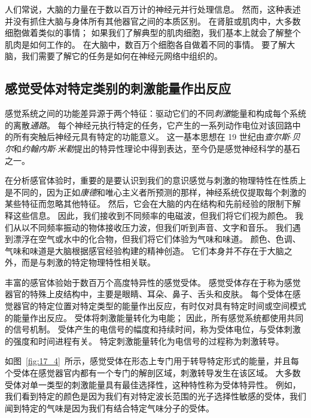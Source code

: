 人们常说，大脑的力量在于数以百万计的神经元并行处理信息。 
然而，这种表述并没有抓住大脑与身体所有其他器官之间的本质区别。 
在肾脏或肌肉中，大多数细胞做着类似的事情； 
如果我们了解典型的肌肉细胞，我们基本上就会了解整个肌肉是如何工作的。 
在大脑中，数百万个细胞各自做着不同的事情。 
要了解大脑，我们需要了解它的任务是如何在神经元网络中组织的。



\subsection{感觉受体对特定类别的刺激能量作出反应}

感觉系统之间的功能差异源于两个特征：驱动它们的不同\textit{刺激}能量和构成每个系统的离散\textit{通路}。 
每个神经元执行特定的任务，它产生的一系列动作电位对该回路中的所有突触后神经元具有特定的功能意义。 
这一基本思想在 19 世纪由\textit{查尔斯$\cdot$贝尔}和\textit{约翰内斯$\cdot$米勒}提出的特异性理论中得到表达，至今仍是感觉神经科学的基石之一。


在分析感官体验时，重要的是要认识到我们的意识感觉与刺激的物理特性在性质上是不同的，因为正如\textit{康德}和唯心主义者所预测的那样，神经系统仅提取每个刺激的某些特征而忽略其他特征。 
然后，它会在大脑的内在结构和先前经验的限制下解释这些信息。 
因此，我们接收到不同频率的电磁波，但我们将它们视为颜色。 
我们从以不同频率振动的物体接收压力波，但我们听到声音、文字和音乐。 
我们遇到漂浮在空气或水中的化合物，但我们将它们体验为气味和味道。 
颜色、色调、气味和味道是大脑根据感官经验构建的精神创造。 
它们本身并不存在于大脑之外，而是与刺激的特定物理特性相关联。


丰富的感官体验始于数百万个高度特异性的感觉受体。 
感觉受体存在于称为感觉器官的特殊上皮结构中，主要是眼睛、耳朵、鼻子、舌头和皮肤。 
每个受体在感觉器官的特定位置对特定类型的能量作出反应，有时仅对具有特定时间或空间模式的能量作出反应。 
受体将刺激能量转化为电能； 
因此，所有感觉系统都使用共同的信号机制。 
受体产生的电信号的幅度和持续时间，称为受体电位，与受体刺激的强度和时间进程有关。
特定刺激能量转化为电信号的过程称为刺激转导。


如图~\ref{fig:17_4}~所示，感觉受体在形态上专门用于转导特定形式的能量，并且每个受体在感觉器官内都有一个专门的解剖区域，刺激转导发生在该区域。 
大多数受体对单一类型的刺激能量具有最佳选择性，这种特性称为受体特异性。
例如，我们看到特定的颜色是因为我们有对特定波长范围的光子选择性敏感的受体，我们闻到特定的气味是因为我们有结合特定气味分子的受体。


